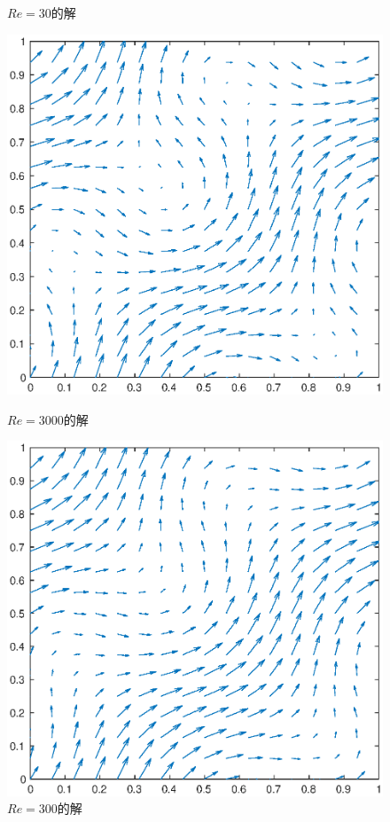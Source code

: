 \documentclass[lang=cn,10pt,bibend=bibtex]{elegantbook}
\begin{document}
\begin{figure}[H]
\begin{minipage}[c]{0.49\linewidth}
\begin{minipage}[t]{0.49\linewidth}
      \caption*{$Re=30$的解}
      \includegraphics[width=0.95\linewidth]{figure/test3_Re=3000.eps}
      \caption*{$Re=3000$的解}
    \end{minipage}
    \begin{minipage}[t]{0.49\linewidth}
      \centering
      \includegraphics[width=0.95\linewidth]{figure/test3_Re=300.eps}
      \caption*{$Re=300$的解}

\end{minipage}
\end{minipage}
\end{figure}
\end{document}
